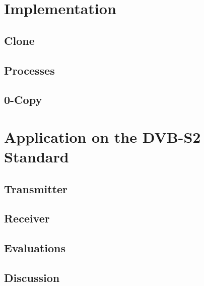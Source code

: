 \section{Implementation}

\subsection{Clone}

\subsection{Processes}

\subsection{0-Copy}

\section{Application on the DVB-S2 Standard}

\subsection{Transmitter}

\subsection{Receiver}

\subsection{Evaluations}

\subsection{Discussion}
